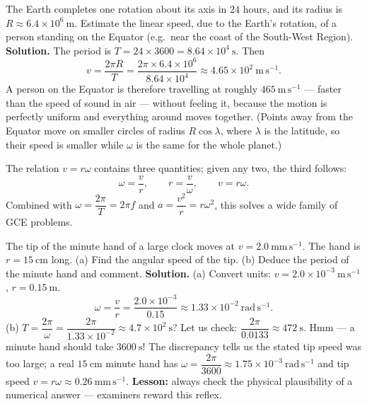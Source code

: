 \documentclass[11pt]{article}
\newcounter{popsec}
\newcounter{popsub}
\newcommand{\courssub}[1]{%
  \stepcounter{popsub}%
  \par\vspace{9pt}\noindent{\popxbold\fontsize{11.5}{13}\selectfont\color{popink}{\color{poporange}\thepopsec.\thepopsub}\hspace{6pt}#1}\par\nopagebreak\vspace{4pt}
}
\begin{document}
\begin{exoresolu}
The Earth completes one rotation about its axis in $24$ hours, and its radius is $R \approx 6.4\times 10^{6}\ \mathrm{m}$. Estimate the linear speed, due to the Earth's rotation, of a person standing on the Equator (e.g.\ near the coast of the South-West Region).
\tcblower
\textbf{Solution.} The period is $T = 24 \times 3600 = 8.64\times 10^{4}\ \mathrm{s}$. Then
\[ v = \frac{2\pi R}{T} = \frac{2\pi \times 6.4\times 10^{6}}{8.64\times 10^{4}} \approx 4.65\times 10^{2}\ \mathrm{m\,s^{-1}}. \]
A person on the Equator is therefore travelling at roughly $465\ \mathrm{m\,s^{-1}}$ --- faster than the speed of sound in air --- without feeling it, because the motion is perfectly uniform and everything around moves together. (Points away from the Equator move on smaller circles of radius $R\cos\lambda$, where $\lambda$ is the latitude, so their speed is smaller while $\omega$ is the same for the whole planet.)
\end{exoresolu}

\courssub{Inverse Problems: Finding $\omega$ or $r$}

The relation $v = r\omega$ contains three quantities; given any two, the third follows:
\[ \omega = \frac{v}{r}, \qquad r = \frac{v}{\omega}, \qquad v = r\omega. \]
Combined with $\omega = \dfrac{2\pi}{T} = 2\pi f$ and $a = \dfrac{v^{2}}{r} = r\omega^{2}$, this solves a wide family of GCE problems.

\begin{exoresolu}
The tip of the minute hand of a large clock moves at $v = 2.0\ \mathrm{mm\,s^{-1}}$. The hand is $r = 15\ \mathrm{cm}$ long. (a) Find the angular speed of the tip. (b) Deduce the period of the minute hand and comment.
\tcblower
\textbf{Solution.}
(a) Convert units: $v = 2.0\times 10^{-3}\ \mathrm{m\,s^{-1}}$, $r = 0.15\ \mathrm{m}$.
\[ \omega = \frac{v}{r} = \frac{2.0\times 10^{-3}}{0.15} \approx 1.33\times 10^{-2}\ \mathrm{rad\,s^{-1}}. \]
(b) $T = \dfrac{2\pi}{\omega} = \dfrac{2\pi}{1.33\times 10^{-2}} \approx 4.7\times 10^{2}\ \mathrm{s}$? Let us check: $\dfrac{2\pi}{0.0133} \approx 472\ \mathrm{s}$. Hmm --- a minute hand should take $3600\ \mathrm{s}$! The discrepancy tells us the stated tip speed was too large; a real $15\ \mathrm{cm}$ minute hand has $\omega = \dfrac{2\pi}{3600} \approx 1.75\times 10^{-3}\ \mathrm{rad\,s^{-1}}$ and tip speed $v = r\omega \approx 0.26\ \mathrm{mm\,s^{-1}}$. \textbf{Lesson:} always check the physical plausibility of a numerical answer --- examiners reward this reflex.
\end{exoresolu}
\end{document}
